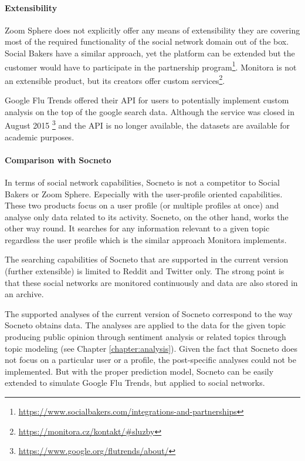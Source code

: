 \paragraph{Extensibility} 

Zoom Sphere does not explicitly offer any means of extensibility they are covering most of the required functionality of the social network domain out of the box. Social Bakers have a similar approach, yet the platform can be extended but the customer would have to participate in the partnership program\footnote{\url{https://www.socialbakers.com/integrations-and-partnerships}}. Monitora is not an extensible product, but its creators offer custom services\footnote{\url{https://monitora.cz/kontakt/\#sluzby}}. 

Google Flu Trends offered their API for users to potentially implement custom analysis on the top of the google search data. Although the service was closed in August 2015 \footnote{\url{https://www.google.org/flutrends/about/}} and the API is no longer available, the datasets are available for academic purposes.

\paragraph{Comparison with Socneto}

In terms of social network capabilities, Socneto is not a competitor to Social Bakers or Zoom Sphere. Especially with the user-profile oriented capabilities. These two products focus on a user profile (or multiple profiles at once) and analyse only data related to its activity. Socneto, on the other hand, works the other way round. It searches for any information relevant to a given topic regardless the user profile which is the similar approach Monitora implements.

The searching capabilities of Socneto that are supported in the current version (further extensible) is limited to Reddit and Twitter only. The strong point is that these social networks are monitored continuously and data are also stored in an archive. 

The supported analyses of the current version of Socneto correspond to the way Socneto obtains data. The analyses are applied to the data for the given topic producing public opinion through sentiment analysis or related topics through topic modeling (see Chapter \ref{chapter:analysis}). Given the fact that Socneto does not focus on a particular user or a profile, the post-specific analyses could not be implemented. But with the proper prediction model, Socneto can be easily extended to simulate Google Flu Trends, but applied to social networks.

